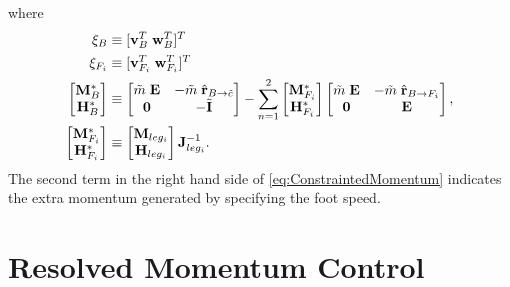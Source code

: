 where
\begin{equation*}
\begin{aligned}
{\bf \xi}_B & \equiv [ {\bf v}^T_{B}\; {\bf w}^T_B]^T\\
{\bf \xi}_{F_i}& \equiv [ {\bf v}^T_{F_i}\; {\bf w}^T_{F_i}]^T\\
\left[
\begin{matrix}
{\bf M}^*_{B}\\
{\bf H}^*_{B}\\
\end{matrix}
\right] &
\equiv
\left[
\begin{matrix}
\tilde{m}\; {\bf E} & -\tilde{m}\; \hat{\bf r}_{B \rightarrow \tilde{c}} \\
{\bf 0}           & - \tilde{\bf I}                                 \\
\end{matrix}
\right]
- \sum^{2}_{n=1} 
\left[
\begin{matrix}
{\bf M}^*_{F_i}\\
{\bf H}^*_{F_i}\\
\end{matrix}
\right]
\left[
\begin{matrix}
\tilde{m}\; {\bf E} & -\tilde{m}\; \hat{\bf r}_{B \rightarrow F_i} \\
{\bf 0}           & {\bf E}                                 \\
\end{matrix}
\right], \\
\left[
\begin{matrix}
{\bf M}^*_{F_i}\\
{\bf H}^*_{F_i}\\
\end{matrix}
\right]
& \equiv
\left[
\begin{matrix}
{\bf M}_{leg_i}\\
{\bf H}_{leg_i}\\
\end{matrix}
\right]
{\bf J}^{-1}_{leg_i}.
\end{aligned}\\
\end{equation*}
The second term in the right hand side of \ref{eq:ConstraintedMomentum} indicates
the extra momentum generated by specifying the foot speed.


	
\section{Resolved Momentum Control}

